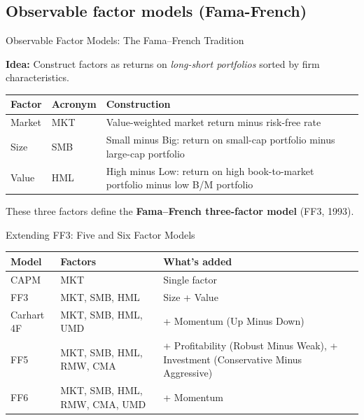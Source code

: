 \documentclass[aspectratio=169]{beamer}
\begin{document}
\subsection{Observable factor models (Fama-French)}
%
\begin{frame}{Observable Factor Models: The Fama--French Tradition}

\textbf{Idea:} Construct factors as returns on \emph{long-short portfolios} sorted by firm characteristics.

\vspace{0.7em}
\begin{center}
\renewcommand{\arraystretch}{1.4}
\begin{tabular}{llp{7cm}}
\toprule
\textbf{Factor} & \textbf{Acronym} & \textbf{Construction} \\
\midrule
Market & MKT & Value-weighted market return minus risk-free rate \\
Size & SMB & Small minus Big: return on small-cap portfolio minus large-cap portfolio \\
Value & HML & High minus Low: return on high book-to-market portfolio minus low B/M portfolio \\
\bottomrule
\end{tabular}
\end{center}

\vspace{0.5em}
These three factors define the \textbf{Fama--French three-factor model} (FF3, 1993).
\end{frame}
%
%
\begin{frame}{Extending FF3: Five and Six Factor Models}
\small
\begin{center}
\renewcommand{\arraystretch}{1.35}
\begin{tabular}{llp{6.5cm}}
\toprule
\textbf{Model} & \textbf{Factors} & \textbf{What's added} \\
\midrule
CAPM & MKT & Single factor \\
FF3 & MKT, SMB, HML & Size + Value \\
Carhart 4F & MKT, SMB, HML, UMD & + Momentum (Up Minus Down) \\
FF5 & MKT, SMB, HML, RMW, CMA & + Profitability (Robust Minus Weak), + Investment (Conservative Minus Aggressive) \\
FF6 & MKT, SMB, HML, RMW, CMA, UMD & + Momentum \\
\bottomrule
\end{tabular}
\end{center}

\vspace{0.7em}
\end{frame}
\end{document}
